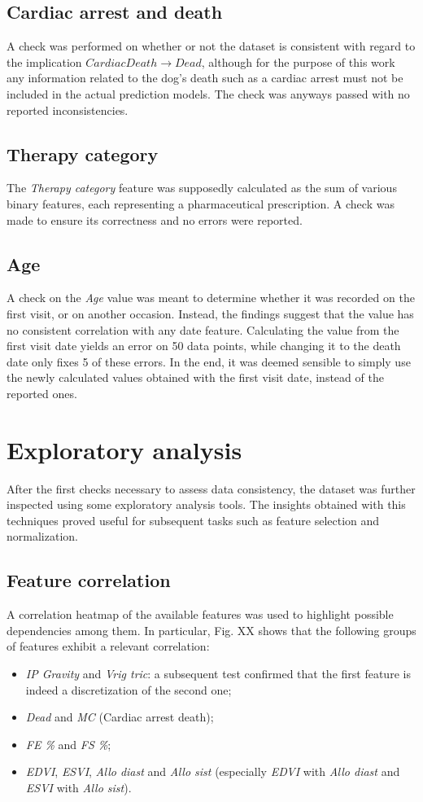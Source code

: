 \documentclass[12pt]{report}
\begin{document}
\subsection*{Cardiac arrest and death}
A check was performed on whether or not the dataset is consistent with regard to the implication $ CardiacDeath \rightarrow Dead $, although for the purpose of this work any information related to the dog's death such as a cardiac arrest must not be included in the actual prediction models. The check was anyways passed with no reported inconsistencies.
\subsection*{Therapy category}
The \textit{Therapy category} feature was supposedly calculated as the sum of various binary features, each representing a pharmaceutical prescription. A check was made to ensure its correctness and no errors were reported.
\subsection*{Age}
A check on the \textit{Age} value was meant to determine whether it was recorded on the first visit, or on another occasion. Instead, the findings suggest that the value has no consistent correlation with any date feature. Calculating the value from the first visit date yields an error on 50 data points, while changing it to the death date only fixes 5 of these errors. In the end, it was deemed sensible to simply use the newly calculated values obtained with the first visit date, instead of the reported ones.

\section{Exploratory analysis}
After the first checks necessary to assess data consistency, the dataset was further inspected using some exploratory analysis tools. The insights obtained with this techniques proved useful for subsequent tasks such as feature selection and normalization.
\subsection*{Feature correlation}
A correlation heatmap of the available features was used to highlight possible dependencies among them. In particular, Fig. XX shows that the following groups of features exhibit a relevant correlation:
\begin{itemize}
\item \textit{IP Gravity} and \textit{Vrig tric}: a subsequent test confirmed that the first feature is indeed a discretization of the second one;
\item \textit{Dead} and \textit{MC} (Cardiac arrest death);
\item \textit{FE \%} and \textit{FS \%};
\item \textit{EDVI}, \textit{ESVI}, \textit{Allo diast} and \textit{Allo sist} (especially \textit{EDVI} with \textit{Allo diast} and \textit{ESVI} with \textit{Allo sist}).
\end{itemize}
\end{document}

